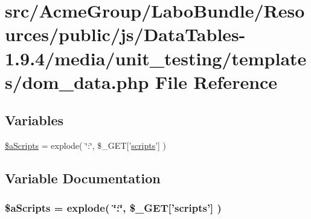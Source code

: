 \hypertarget{dom__data_8php}{\section{src/\+Acme\+Group/\+Labo\+Bundle/\+Resources/public/js/\+Data\+Tables-\/1.9.4/media/unit\+\_\+testing/templates/dom\+\_\+data.php File Reference}
\label{dom__data_8php}
}
\subsection*{Variables}
\begin{DoxyCompactItemize}
\item 
\hyperlink{dom__data_8php_a3e8e1608000c9afdd05327fc2b06b056}{\$a\+Scripts} = explode( \char`\"{}\+:\char`\"{}, \$\+\_\+\+G\+E\+T\mbox{[}'\hyperlink{tinymce_8jquery_8dev_8js_a09066d4d580eeec222f858d588b4cdef}{scripts}'\mbox{]} )
\end{DoxyCompactItemize}


\subsection{Variable Documentation}
\hypertarget{dom__data_8php_a3e8e1608000c9afdd05327fc2b06b056}{
\subsubsection[{\$a\+Scripts}]{\setlength{\rightskip}{0pt plus 5cm}\$a\+Scripts = explode( \char`\"{}\+:\char`\"{}, \$\+\_\+\+G\+E\+T\mbox{[}'{\bf scripts}'\mbox{]} )}}\label{dom__data_8php_a3e8e1608000c9afdd05327fc2b06b056}
